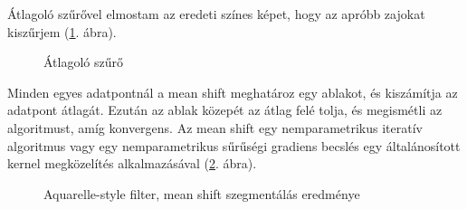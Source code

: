 
Átlagoló szűrővel elmostam az eredeti színes képet, hogy az apróbb zajokat kiszűrjem (\ref{fig:paint1}. ábra).

\begin{figure}[ht]
\centering
{}
\caption{Átlagoló szűrő  } 
\label{fig:paint1}
\end{figure}


Minden egyes adatpontnál a mean shift meghatároz egy ablakot, és kiszámítja az adatpont átlagát. Ezután az ablak közepét az átlag felé tolja, és megismétli az algoritmust, amíg konvergens. Az mean shift egy nemparametrikus iteratív algoritmus vagy egy nemparametrikus sűrűségi gradiens becslés egy általánosított kernel megközelítés alkalmazásával (\ref{fig:paint2}. ábra).

\begin{figure}[ht]
\centering
{}
\caption{Aquarelle-style filter, mean shift szegmentálás  eredménye} 
\label{fig:paint2}
\end{figure}

